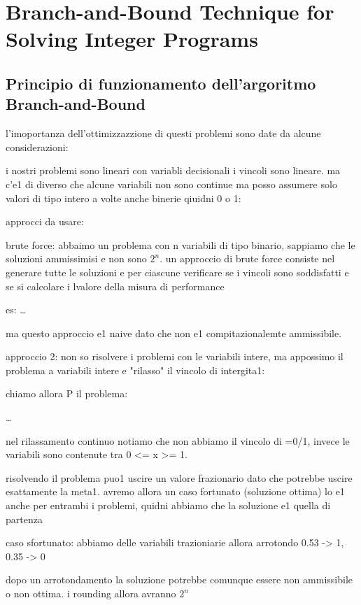 \newpage
\section{Branch-and-Bound Technique for Solving Integer Programs}

\subsection{Principio di funzionamento dell'argoritmo Branch-and-Bound}

l'imoportanza dell'ottimizzazzione di questi problemi sono date da alcune considerazioni:

i nostri problemi sono lineari con variabli decisionali i vincoli sono lineare. ma c'e1 di diverso che alcune variabili non sono continue ma posso assumere solo valori di tipo intero a volte anche binerie qiuidni 0 o 1:

approcci da usare:

brute force:
abbaimo un problema con n variabili di tipo binario, sappiamo che le soluzioni ammissimisi e non sono $2^n$. un approccio di brute force consiste nel generare tutte le soluzioni e per ciascune verificare se i vincoli sono soddisfatti e se si calcolare i lvalore della misura di performance

es:
\dots

ma questo approccio e1 naive dato che non e1 compitazionalemte ammissibile.

approccio 2:
non so risolvere i problemi con le variabili intere, ma appossimo il problema a variabili intere e "rilasso" il vincolo di intergita1:

chiamo allora P  il problema:

\dots

nel rilassamento continuo notiamo che non abbiamo il vincolo di =0/1, invece le variabili sono contenute tra 0 <= x >= 1.

risolvendo il problema puo1 uscire un valore frazionario dato che potrebbe uscire esattamente la meta1. avremo allora un caso fortunato (soluzione ottima) lo e1 anche per entrambi i problemi, quidni abbiamo che la soluzione e1 quella di partenza


caso sfortunato: abbiamo delle variabili trazioniarie allora arrotondo 0.53 -> 1, 0.35 -> 0

dopo un arrotondamento la soluzione potrebbe comunque essere non ammissibile o non ottima. i rounding allora avranno $2^{n}$



